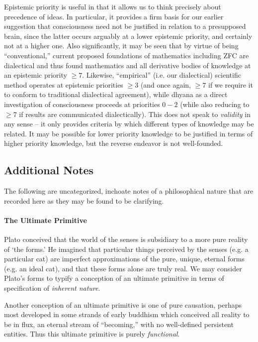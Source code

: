 \documentclass[pra,twocolumn,groupedaddress,10pt]{revtex4}
\theoremstyle{definition}
\begin{document}
Epistemic priority is useful in that it allows us to think precisely about precedence of ideas. In particular, it provides a firm basis for our earlier suggestion that consciousness need not be justified in relation to a presupposed brain, since the latter occurs arguably at a lower epistemic priority, and certainly not at a higher one. Also significantly, it may be seen that by virtue of being ``conventional,'' current proposed foundations of mathematics including ZFC are dialectical and thus found mathematics and all derivative bodies of knowledge at an epistemic priority $\geq 7$. Likewise, ``empirical'' (i.e. our dialectical) scientific method operates at epistemic priorities $\geq 3$ (and once again, $\geq 7$ if we require it to conform to traditional dialectical agreement), while dhyana as a direct investigation of consciousness proceeds at priorities $0 - 2$ (while also reducing to $\geq 7$ if results are communicated dialectically). This does not speak to \emph{validity} in any sense -- it only provides criteria by which different types of knowledge may be related. It may be possible for lower priority knowledge to be justified in terms of higher priority knowledge, but the reverse endeavor is not well-founded.

\subsection{Additional Notes}

The following are uncategorized, inchoate notes of a philosophical nature that are recorded here as they may be found to be clarifying.

\paragraph{The Ultimate Primitive} \label{sec:ultpri} Plato conceived that the world of the senses is subsidiary to a more pure reality of `the forms.' He imagined that particular things perceived by the senses (e.g. a particular cat) are imperfect approximations of the pure, unique, eternal forms (e.g. an ideal cat), and that these forms alone are truly real. We may consider Plato's forms to typify a conception of an ultimate primitive in terms of specification of \emph{inherent nature}.

Another conception of an ultimate primitive is one of pure causation, perhaps most developed in some strands of early buddhism which conceived all reality to be in flux, an eternal stream of ``becoming,'' with no well-defined persistent entities. Thus this ultimate primitive is purely \emph{functional}.
\end{document}
